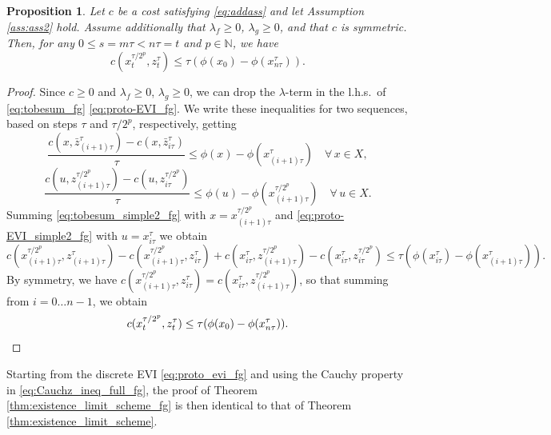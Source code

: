 \documentclass[reqno]{amsart}
\newcounter{results}[section]
\theoremstyle{plain}
\newtheorem{proposition}[results]{Proposition}
\theoremstyle{remark}
\theoremstyle{plain}
\numberwithin{equation}{section}
\theoremstyle{remark}
\newcommand{\N}{\mathbb{N}}
\begin{document}
\begin{proposition}  Let $c$ be a cost satisfying \eqref{eq:addass}  and let  Assumption \ref{ass:ass2} hold. Assume   additionally  that  $\lambda_f\ge 0$, $\lambda_g\ge 0$, and  that  $c$  is symmetric. Then, for any $0 \le s= m\tau < n\tau=t$ and $p \in \N$, we have
\begin{equation}\label{eq:Cauchz_ineq_full_fg}
c(x_{t}^{\tau/2^p},z_{t}^\tau)
    \le \tau(\phi(x_0)-\phi(x_{n\tau}^\tau)) . 
\end{equation}
\end{proposition}
\begin{proof} Since $c\ge 0$ and $\lambda_f\ge 0$, $\lambda_g\ge 0$,  we can drop the $\lambda$-term in the l.h.s.\  of  
\eqref{eq:tobesum_fg} \eqref{eq:proto-EVI_fg}. We write these inequalities for two sequences, based on steps $\tau$ and $\tau/2^p$,  respectively, getting 
\begin{equation}\label{eq:tobesum_simple2_fg}
\frac{c(x,\bar{z}_{(i+1)\tau}^\tau)- c(x,\bar{z}_{i\tau}^\tau)}{\tau} \le \phi(x)-\phi(x_{(i+1)\tau}^\tau) \quad \forall \, x \in X,
\end{equation}
\begin{equation}\label{eq:proto-EVI_simple2_fg}
    \frac{c(u,z_{(i+1)\tau}^{\tau/2^p})-c(u,z_{i\tau}^{\tau/2^p})}{\tau} \le \phi(u) -\phi(x_{(i+1)\tau}^{\tau/2^p}) \quad \forall \, u \in X.
\end{equation}
 Summing  \eqref{eq:tobesum_simple2_fg} with $x=x_{(i+1)\tau}^{\tau/2^p}$ and \eqref{eq:proto-EVI_simple2_fg} with $u=x_{i\tau}^\tau$ we obtain
\begin{equation*}
    c(x_{(i+1)\tau}^{\tau/2^p},z_{(i+1)\tau}^\tau)- c(x_{(i+1)\tau}^{\tau/2^p},z_{i\tau}^\tau) + c(x_{i\tau}^\tau,z_{(i+1)\tau}^{\tau/2^p})-c(x_{i\tau}^\tau,z_{i\tau}^{\tau/2^p})
    \le \tau(\phi(x_{i\tau}^\tau)-\phi(x_{(i+1)\tau}^\tau)).
\end{equation*}
 By symmetry, we have  $c(x_{(i+1)\tau}^{\tau/2^p},z_{i\tau}^\tau)= c(x_{i\tau}^\tau,z_{(i+1)\tau}^{\tau/2^p})$,  so that summing  from $i=0\dots n-1$,  we   obtain
\begin{equation*}
    c(x_{t}^{\tau/2^p},z_{t}^\tau)
    \le \tau(\phi(x_0)-\phi(x_{n\tau}^\tau)).\qedhere
\end{equation*}
\end{proof}

 Starting from the discrete EVI \eqref{eq:proto_evi_fg} and using the Cauchy property in \eqref{eq:Cauchz_ineq_full_fg}, the proof of Theorem \ref{thm:existence_limit_scheme_fg} is then identical to  that  of Theorem \ref{thm:existence_limit_scheme}.    
\end{document}
